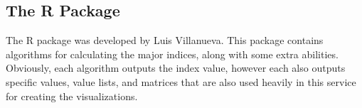 \subsection{The  R Package}
The  R package was developed by Luis Villanueva. This package contains algorithms for calculating the major indices, along with some extra abilities. Obviously, each algorithm outputs the index value, however each also outputs specific values, value lists, and matrices that are also used heavily in this service for creating the visualizations.








